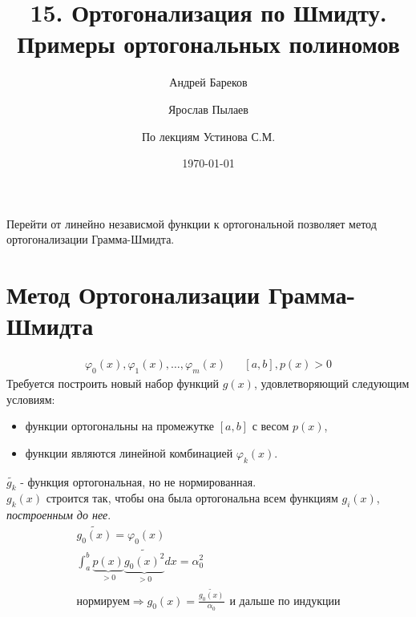 \documentclass[a4paper,11pt]{article}
\title{15. Ортогонализация по Шмидту. Примеры ортогональных полиномов}
\author{Андрей Бареков \and Ярослав Пылаев \and По лекциям Устинова С.М.}
\date{\today}
\begin{document}
\maketitle
\newpage

Перейти от линейно независмой функции к ортогональной позволяет метод ортогонализации Грамма-Шмидта.
\section{Метод Ортогонализации Грамма-Шмидта}
\begin{align*}
  \varphi_0(x), \varphi_1(x), \dots, \varphi_m(x) && [a,b], p(x)>0
\end{align*}
Требуется построить новый набор функций $g(x)$, удовлетворяющий следующим условиям:
\begin{itemize}
  \item функции ортогональны на промежутке $[a,b]$ с весом $p(x)$,
  \item функции являются линейной комбинацией $\varphi_k(x)$.
\end{itemize}
\vspace{5mm}
$\widetilde{g_k}$ - функция ортогональная, но не нормированная. \\
$g_k(x)$ строится так, чтобы она была ортогональна всем функциям $g_i(x)$, \textit{построенным до нее}.
\begin{gather*}
  \widetilde{g_0(x)} = \varphi_0(x) \\
  \int_a^b \underbrace{p(x)}_{>0}\underbrace{\widetilde{g_0(x)^2}}_{>0}dx = \alpha_0^2 \\
  \textit{нормируем} \Rightarrow g_0(x) = \frac{\widetilde{g_0(x)}}{\alpha_0} \hspace{5pt}\text{и дальше по индукции}
\end{gather*}
\end{document}
